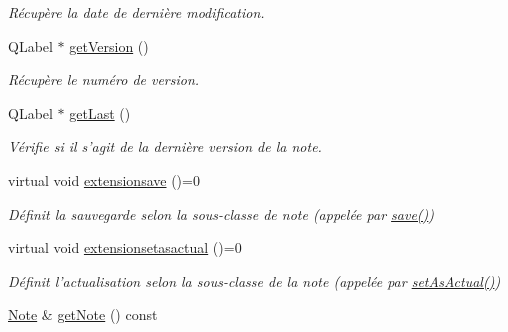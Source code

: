 \begin{DoxyCompactItemize}
\begin{DoxyCompactList}\small\item\em Récupère la date de dernière modification. \end{DoxyCompactList}\item 
\hypertarget{class_note_editeur_ab8faf02aaffcb1290c9129b865e84180}{Q\-Label $\ast$ \hyperlink{class_note_editeur_ab8faf02aaffcb1290c9129b865e84180}{get\-Version} ()}\label{class_note_editeur_ab8faf02aaffcb1290c9129b865e84180}

\begin{DoxyCompactList}\small\item\em Récupère le numéro de version. \end{DoxyCompactList}\item 
\hypertarget{class_note_editeur_a1e1cee521fbbfb134f5b07b80996108d}{Q\-Label $\ast$ \hyperlink{class_note_editeur_a1e1cee521fbbfb134f5b07b80996108d}{get\-Last} ()}\label{class_note_editeur_a1e1cee521fbbfb134f5b07b80996108d}

\begin{DoxyCompactList}\small\item\em Vérifie si il s'agit de la dernière version de la note. \end{DoxyCompactList}\item 
\hypertarget{class_note_editeur_a35df5a555f5852f50ad8ca19f2e81bd1}{virtual void \hyperlink{class_note_editeur_a35df5a555f5852f50ad8ca19f2e81bd1}{extensionsave} ()=0}\label{class_note_editeur_a35df5a555f5852f50ad8ca19f2e81bd1}

\begin{DoxyCompactList}\small\item\em Définit la sauvegarde selon la sous-\/classe de note (appelée par \hyperlink{class_note_editeur_a605b1bca885c25460cb7d8863d1f3d03}{save()}) \end{DoxyCompactList}\item 
\hypertarget{class_note_editeur_a30bc10104ce0faac9d1261fcddd22589}{virtual void \hyperlink{class_note_editeur_a30bc10104ce0faac9d1261fcddd22589}{extensionsetasactual} ()=0}\label{class_note_editeur_a30bc10104ce0faac9d1261fcddd22589}

\begin{DoxyCompactList}\small\item\em Définit l'actualisation selon la sous-\/classe de la note (appelée par \hyperlink{class_note_editeur_a857f285628a0b7dcb6a69b18c977aa71}{set\-As\-Actual()}) \end{DoxyCompactList}\item 
\hypertarget{class_note_editeur_ad22efc99d3eb21b040332271af95c39e}{\hyperlink{class_note}{Note} \& \hyperlink{class_note_editeur_ad22efc99d3eb21b040332271af95c39e}{get\-Note} () const }\label{class_note_editeur_ad22efc99d3eb21b040332271af95c39e}


\end{DoxyCompactItemize}
